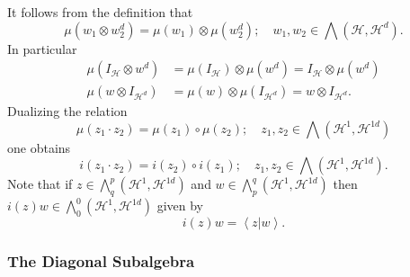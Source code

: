 \documentclass[aps,preprint]{revtex4}%
\begin{document}
It follows from the definition that
\begin{equation}
\mu\left(  w_{1}\otimes w_{2}^{d}\right)  =\mu\left(  w_{1}\right)  \otimes
\mu\left(  w_{2}^{d}\right)  ;\quad w_{1},w_{2}\in%
{\textstyle\bigwedge}
\left(  \mathcal{H},\mathcal{H}^{d}\right)  .
\end{equation}
In particular
\begin{align}
\mu\left(  I_{\mathcal{H}}\otimes w^{d}\right)   &  =\mu\left(  I_{\mathcal{H}%
}\right)  \otimes\mu\left(  w^{d}\right)  =I_{\mathcal{H}}\otimes\mu\left(
w^{d}\right) \\
\mu\left(  w\otimes I_{\mathcal{H}^{d}}\right)   &  =\mu\left(  w\right)
\otimes\mu\left(  I_{\mathcal{H}^{d}}\right)  =w\otimes I_{\mathcal{H}^{d}}.
\end{align}
Dualizing the relation
\begin{equation}
\mu\left(  z_{1}\cdot z_{2}\right)  =\mu\left(  z_{1}\right)  \circ\mu\left(
z_{2}\right)  ;\quad z_{1},z_{2}\in%
{\textstyle\bigwedge}
\left(  \mathcal{H}^{1},\mathcal{H}^{1d}\right)
\end{equation}
one obtains
\begin{equation}
i\left(  z_{1}\cdot z_{2}\right)  =i\left(  z_{2}\right)  \circ i\left(
z_{1}\right)  ;\quad z_{1},z_{2}\in%
{\textstyle\bigwedge}
\left(  \mathcal{H}^{1},\mathcal{H}^{1d}\right)  .
\end{equation}
Note that if $z\in%
{\textstyle\bigwedge\nolimits_{q}^{p}}
\left(  \mathcal{H}^{1},\mathcal{H}^{1d}\right)  $ and $w\in%
{\textstyle\bigwedge\nolimits_{p}^{q}}
\left(  \mathcal{H}^{1},\mathcal{H}^{1d}\right)  $ then $i\left(  z\right)
w\in%
{\textstyle\bigwedge\nolimits_{0}^{0}}
\left(  \mathcal{H}^{1},\mathcal{H}^{1d}\right)  $ given by
\begin{equation}
i\left(  z\right)  w=\left\langle \left.  z\right\vert w\right\rangle .
\end{equation}


\subsubsection{The Diagonal Subalgebra}
\end{document}
